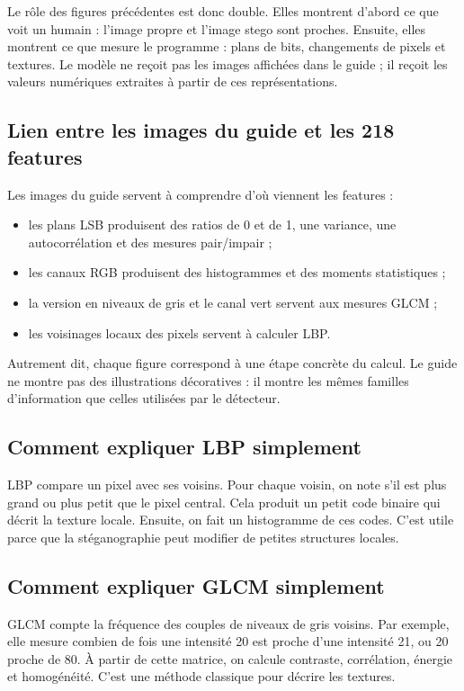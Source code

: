 \documentclass[11pt,a4paper]{article}
\begin{document}
Le rôle des figures précédentes est donc double. Elles montrent d'abord ce que voit un humain : l'image propre et l'image stego sont proches. Ensuite, elles montrent ce que mesure le programme : plans de bits, changements de pixels et textures. Le modèle ne reçoit pas les images affichées dans le guide ; il reçoit les valeurs numériques extraites à partir de ces représentations.

\subsection*{Lien entre les images du guide et les 218 features}
Les images du guide servent à comprendre d'où viennent les features :
\begin{itemize}
  \item les plans LSB produisent des ratios de 0 et de 1, une variance, une autocorrélation et des mesures pair/impair ;
  \item les canaux RGB produisent des histogrammes et des moments statistiques ;
  \item la version en niveaux de gris et le canal vert servent aux mesures GLCM ;
  \item les voisinages locaux des pixels servent à calculer LBP.
\end{itemize}

Autrement dit, chaque figure correspond à une étape concrète du calcul. Le guide ne montre pas des illustrations décoratives : il montre les mêmes familles d'information que celles utilisées par le détecteur.

\subsection*{Comment expliquer LBP simplement}
LBP compare un pixel avec ses voisins. Pour chaque voisin, on note s'il est plus grand ou plus petit que le pixel central. Cela produit un petit code binaire qui décrit la texture locale. Ensuite, on fait un histogramme de ces codes. C'est utile parce que la stéganographie peut modifier de petites structures locales.

\subsection*{Comment expliquer GLCM simplement}
GLCM compte la fréquence des couples de niveaux de gris voisins. Par exemple, elle mesure combien de fois une intensité 20 est proche d'une intensité 21, ou 20 proche de 80. À partir de cette matrice, on calcule contraste, corrélation, énergie et homogénéité. C'est une méthode classique pour décrire les textures.
\end{document}
